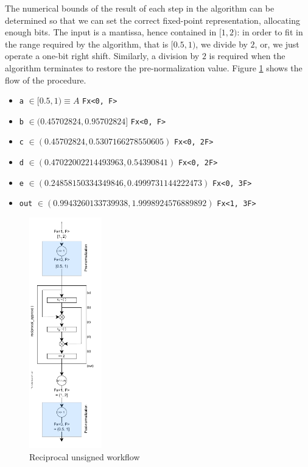 The numerical bounds of the result of each step in the algorithm can be determined so that we can set the correct fixed-point representation, allocating enough bits.
The input is a mantissa, hence contained in $[1, 2)$: in order to fit in the range required by the algorithm, that is $[0.5, 1)$, we divide by $2$, or, we just operate a one-bit right shift. Similarly, a division by $2$ is required when the algorithm terminates to restore the pre-normalization value.
Figure \ref{fig:reciprocal_unsigned_workflow} shows the flow of the procedure. 
\begin{itemize}
    \item \texttt{a} $\in [0.5, 1) \equiv A $ \dotfill \texttt{Fx<0, F>}
    \item \texttt{b} $\in (0.45702824, 0.95702824] $ \dotfill \texttt{Fx<0, F>}
    \item \texttt{c} $\in (0.45702824, 0.5307166278550605) $ \dotfill \texttt{Fx<0, 2F>}
    \item \texttt{d} $\in (0.47022002214493963, 0.54390841) $ \dotfill \texttt{Fx<0, 2F>}
    \item \texttt{e} $\in (0.24858150334349846, 0.4999731144222473) $ \dotfill \texttt{Fx<0, 3F>}
    \item \texttt{out} $\in (0.9943260133739938, 1.9998924576889892) $ \dotfill \texttt{Fx<1, 3F>}
\end{itemize}



    

\begin{figure}
    \centering
    \includegraphics[width=0.28\textwidth]{figures/reciprocal_unsigned.drawio.pdf}
    \caption{Reciprocal unsigned workflow}
    \label{fig:reciprocal_unsigned_workflow}
\end{figure}

